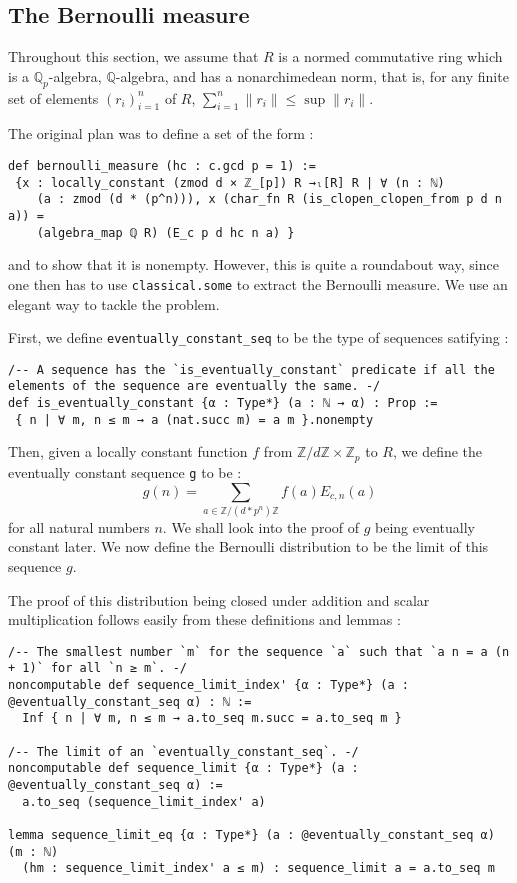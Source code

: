\documentclass[a4paper,UKenglish,cleveref, autoref, thm-restate]{lipics-v2021}
\newcommand{\lean}[1]{\texttt{#1}\xspace} %
\begin{document}
\subsection{The Bernoulli measure}
Throughout this section, we assume that $R$ is a normed commutative ring which is a $\mathbb{Q}_p$-algebra, 
$\mathbb{Q}$-algebra, and has a nonarchimedean norm, that is, for any finite set of elements 
$(r_i)_{i = 1}^n$ of $R$, $\sum_{i = 1}^n \parallel r_i \parallel \le \sup \parallel r_i \parallel$.

The original plan was to define a set of the form : 
\begin{lstlisting}
def bernoulli_measure (hc : c.gcd p = 1) :=
 {x : locally_constant (zmod d × ℤ_[p]) R →ₗ[R] R | ∀ (n : ℕ) 
    (a : zmod (d * (p^n))), x (char_fn R (is_clopen_clopen_from p d n a)) = 
    (algebra_map ℚ R) (E_c p d hc n a) }
\end{lstlisting}

and to show that it is nonempty. However, this is quite a roundabout way, since one then has to use 
\lean{classical.some} to extract the Bernoulli measure. We use an elegant way to tackle the problem. 

First, we define \lean{eventually\_constant\_seq} to be the type of sequences satifying : 
\begin{lstlisting}
/-- A sequence has the `is_eventually_constant` predicate if all the elements of the sequence are eventually the same. -/
def is_eventually_constant {α : Type*} (a : ℕ → α) : Prop :=
 { n | ∀ m, n ≤ m → a (nat.succ m) = a m }.nonempty
\end{lstlisting}

Then, given a locally constant function $f$ from $\mathbb{Z}/d \mathbb{Z} \times \mathbb{Z}_p$ to $R$, 
we define the eventually constant sequence \lean{g} to be : 
$$ g(n) = \sum_{a \in \mathbb{Z}/(d*p^n) \mathbb{Z}} f(a) E_{c, n}(a) $$ 
for all natural numbers $n$. We shall look into the proof of $g$ being eventually constant later. We now define the Bernoulli 
distribution to be the limit of this sequence $g$. 

The proof of this distribution being closed under addition and scalar multiplication follows easily from these definitions and lemmas : 
\begin{lstlisting}
/-- The smallest number `m` for the sequence `a` such that `a n = a (n + 1)` for all `n ≥ m`. -/
noncomputable def sequence_limit_index' {α : Type*} (a : @eventually_constant_seq α) : ℕ :=
  Inf { n | ∀ m, n ≤ m → a.to_seq m.succ = a.to_seq m }

/-- The limit of an `eventually_constant_seq`. -/
noncomputable def sequence_limit {α : Type*} (a : @eventually_constant_seq α) :=
  a.to_seq (sequence_limit_index' a)

lemma sequence_limit_eq {α : Type*} (a : @eventually_constant_seq α) (m : ℕ)
  (hm : sequence_limit_index' a ≤ m) : sequence_limit a = a.to_seq m
\end{lstlisting}
\end{document}
